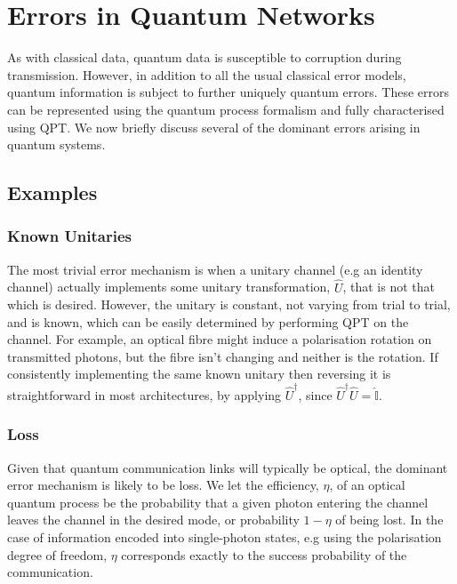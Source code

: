 \documentclass[aps,rmp,twocolumn,amsmath,amssymb,nofootinbib,superscriptaddress]{revtex4}
\begin{document}
%
%

\section{Errors in Quantum Networks} \label{sec:errors_in_nets}

As with classical data, quantum data is susceptible to corruption during transmission. However, in addition to all the usual classical error models, quantum information is subject to further uniquely quantum errors. These errors can be represented using the quantum process formalism and fully characterised using QPT. We now briefly discuss several of the dominant errors arising in quantum systems.

%
%

\subsection{Examples}

%
%

\subsubsection{Known Unitaries}

The most trivial error mechanism is when a unitary channel (e.g an identity channel) actually implements some unitary transformation, $\hat{U}$, that is not that which is desired. However, the unitary is constant, not varying from trial to trial, and is known, which can be easily determined by performing QPT on the channel. For example, an optical fibre might induce a polarisation rotation on transmitted photons, but the fibre isn't changing and neither is the rotation. If consistently implementing the same known unitary then reversing it is straightforward in most architectures, by applying $\hat{U}^\dag$, since $\hat{U}^\dag\hat{U}=\hat{\mathbb{I}}$.

%
%

\subsubsection{Loss} \label{sec:eff_err}

Given that quantum communication links will typically be optical, the dominant error mechanism is likely to be loss. We let the efficiency, $\eta$, of an optical quantum process be the probability that a given photon entering the channel leaves the channel in the desired mode, or probability \mbox{$1-\eta$} of being lost. In the case of information encoded into single-photon states, e.g using the polarisation degree of freedom, $\eta$ corresponds exactly to the success probability of the communication.
\end{document}
